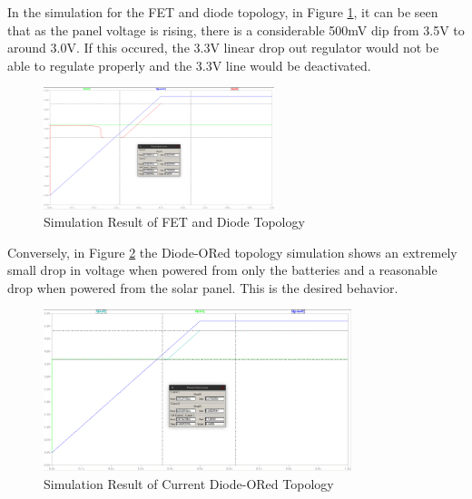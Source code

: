\documentclass{article}
\numberwithin{figure}{section}
\numberwithin{equation}{section}
\begin{document}
{In the simulation for the FET and diode topology, in Figure \ref{fig:doredsimres1}, it can be seen that as the panel voltage is rising, there is a considerable 500mV dip from 3.5V to around 3.0V. If this occured, the 3.3V linear drop out regulator would not be able to regulate properly and the 3.3V line would be deactivated.
\begin{figure}[H]
	\centering
	\includegraphics[width=0.6\textwidth]{DiodeORres1}
	\caption{Simulation Result of FET and Diode Topology}
	\label{fig:doredsimres1}
\end{figure}

Conversely, in Figure \ref{fig:doredsimres2} the Diode-ORed topology simulation shows an extremely small drop in voltage when powered from only the batteries and a reasonable drop when powered from the solar panel. This is the desired behavior.
\begin{figure}[H]
	\centering
	\includegraphics[width=0.8\textwidth]{DiodeORres2}
	\caption{Simulation Result of Current Diode-ORed Topology}
	\label{fig:doredsimres2}
\end{figure}

\newpage
}
\end{document}
